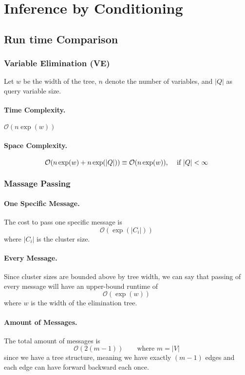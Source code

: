 \documentclass[11pt]{article}
\begin{document}
\section{Inference by Conditioning}
\subsection{Run time Comparison}
\subsubsection{Variable Elimination (VE)}
Let $w$ be the width of the tree, $n$ denote the number of variables, and $|Q|$ as query variable size.
\paragraph{Time Complexity.} $\mathcal O (n \exp (w))$

\paragraph{Space Complexity.} 
\begin{equation}
	\mathcal O (n \exp (w) + n \exp (|Q|)) \equiv \mathcal O (n \exp (w)) \text{, \quad if } |Q| < \infty
\end{equation}

\subsubsection{Massage Passing}
\paragraph{One Specific Message.} The cost to pass one specific message is
\begin{equation}
	\mathcal O (\exp ( |C_i|)) 
\end{equation}
where $|C_i|$ is the cluster size. 

\paragraph{Every Message.} Since cluster sizes are bounded above by tree width, we can say that passing of every message will have an upper-bound runtime of
\begin{equation}
	\mathcal O ( \exp (w) )
\end{equation}
where $w$ is the width of the elimination tree. 

\paragraph{Amount of Messages.} The total amount of messages is 
\begin{equation}
	\mathcal O (2 (m - 1)) \quad \quad \text{where $m = |V|$}
\end{equation}
since we have a tree structure, meaning we have exactly $(m - 1)$ edges and each edge can have forward backward each once. 
\end{document}
